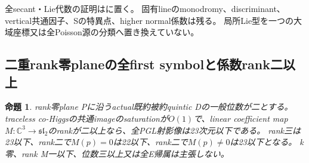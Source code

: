 \documentclass[a4paper,11pt]{ltjsarticle}
\newtheorem{proposition}{命題}[section]
\theoremstyle{definition}
\begin{document}
全secant・Lie代数の証明はに置く。
固有lineのmonodromy、discriminant、vertical共通因子、Sの特異点、higher normal係数は残る。
局所Lie型を一つの大域座標又は全Poisson源の分類へ置き換えていない。

\subsection{二重rank零planeの全first symbolと係数rank二以上}
\begin{proposition}\label{prop:plane-zero-k1-rank-atleast-two-G}
rank零plane Pに沿うactual既約被約quintic Dの一般位数が二とする。
traceless co-Higgsの共通imageのsaturationが$O(1)$で、linear coefficient map
$M:\mathbb C^3\to\mathfrak{sl}_2$のrankが二以上なら、全PGL射影像は23次元以下である。
rank三は23以下、rank二で$M(p)=0$は22以下、rank二で$M(p)\ne0$は23以下となる。
k零、rank M一以下、位数三以上又は全E帰属は主張しない。
\end{proposition}
\end{document}
